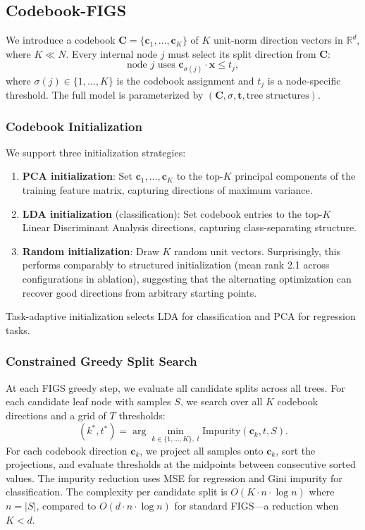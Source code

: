 \documentclass[11pt,letterpaper]{article}
\begin{document}
\subsection{Codebook-FIGS}

We introduce a codebook $\mathbf{C} = \{\mathbf{c}_1, \ldots, \mathbf{c}_K\}$ of $K$ unit-norm direction vectors in $\mathbb{R}^d$, where $K \ll N$. Every internal node $j$ must select its split direction from $\mathbf{C}$:
\begin{equation}
\text{node } j \text{ uses } \mathbf{c}_{\sigma(j)} \cdot \mathbf{x} \leq t_j,
\end{equation}
where $\sigma(j) \in \{1, \ldots, K\}$ is the codebook assignment and $t_j$ is a node-specific threshold. The full model is parameterized by $(\mathbf{C}, \sigma, \mathbf{t}, \text{tree structures})$.

\subsubsection{Codebook Initialization}

We support three initialization strategies:
\begin{enumerate}[leftmargin=*]
    \item \textbf{PCA initialization}: Set $\mathbf{c}_1, \ldots, \mathbf{c}_K$ to the top-$K$ principal components of the training feature matrix, capturing directions of maximum variance.
    \item \textbf{LDA initialization} (classification): Set codebook entries to the top-$K$ Linear Discriminant Analysis directions, capturing class-separating structure.
    \item \textbf{Random initialization}: Draw $K$ random unit vectors. Surprisingly, this performs comparably to structured initialization (mean rank 2.1 across configurations in ablation), suggesting that the alternating optimization can recover good directions from arbitrary starting points.
\end{enumerate}
Task-adaptive initialization selects LDA for classification and PCA for regression tasks.

\subsubsection{Constrained Greedy Split Search}

At each FIGS greedy step, we evaluate all candidate splits across all trees. For each candidate leaf node with samples $S$, we search over all $K$ codebook directions and a grid of $T$ thresholds:
\begin{equation}
(k^*, t^*) = \arg\min_{k \in \{1,\ldots,K\},\; t} \text{Impurity}(\mathbf{c}_k, t, S).
\end{equation}
For each codebook direction $\mathbf{c}_k$, we project all samples onto $\mathbf{c}_k$, sort the projections, and evaluate thresholds at the midpoints between consecutive sorted values. The impurity reduction uses MSE for regression and Gini impurity for classification. The complexity per candidate split is $O(K \cdot n \cdot \log n)$ where $n = |S|$, compared to $O(d \cdot n \cdot \log n)$ for standard FIGS---a reduction when $K < d$.
\end{document}
